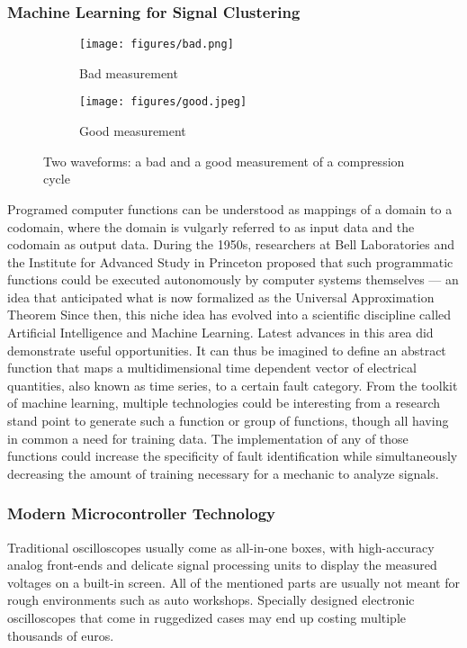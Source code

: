 \subsubsection{Machine Learning for Signal Clustering}
\begin{figure}[ht]
  \centering
  
  \begin{subfigure}[b]{0.48\linewidth}
    \texttt{[image: figures/bad.png]}
    \caption{Bad measurement}
  \end{subfigure}
  \hfill
  \begin{subfigure}[b]{0.48\linewidth}
    \texttt{[image: figures/good.jpeg]}
    \caption{Good measurement}
  \end{subfigure}

  \caption{Two waveforms: a bad and a good measurement of a compression cycle}
  \label{fig:waveforms_good_bad}
\end{figure}
Programed computer functions can be understood as mappings of a domain to a codomain, where the domain is vulgarly referred to as input data and the codomain as output data. 
During the 1950s, researchers at Bell Laboratories and the Institute for Advanced Study in Princeton proposed that such programmatic functions could be executed autonomously by computer systems themselves 
— an idea that anticipated what is now formalized as the Universal Approximation Theorem Since then, this niche idea has evolved into a scientific discipline called Artificial Intelligence and Machine Learning. 
Latest advances in this area did demonstrate useful opportunities. 
It can thus be imagined to define an abstract function that maps a multidimensional time dependent vector of electrical quantities, also known as time series, to a certain fault category. 
From the toolkit of machine learning, multiple technologies could be interesting from a research stand point to generate such a function or group of functions, though all having in common a need for training data. 
The implementation of any of those functions could increase the specificity of fault identification while simultaneously decreasing the amount of training necessary for a mechanic to analyze signals.

\subsubsection{Modern Microcontroller Technology}
Traditional oscilloscopes usually come as all-in-one boxes, with high-accuracy analog front-ends and delicate signal processing units to display the measured voltages on a built-in screen. 
All of the mentioned parts are usually not meant for rough environments such as auto workshops. 
Specially designed electronic oscilloscopes that come in ruggedized cases may end up costing multiple thousands of euros.

